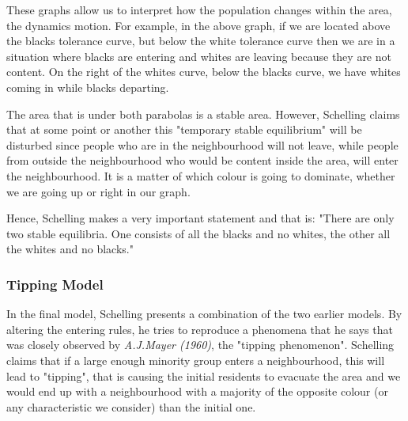 \documentclass[../main.tex]{subfiles}
\begin{document}
These graphs allow us to interpret how the population changes within the area, the dynamics motion. For example, in the above graph, if we are located above the blacks tolerance curve, but below the white tolerance curve then we are in a situation where blacks are entering and whites are leaving because they are not content. On the right of the whites curve, below the blacks curve, we have whites coming in while blacks departing. 

The area that is under both parabolas is a stable area. However, Schelling claims that at some point or another this "temporary stable equilibrium" will be disturbed since people who are in the neighbourhood will not leave, while people from outside the neighbourhood who would be content inside the area, will enter the neighbourhood. It is a matter of which colour is going to dominate, whether we are going up or right in our graph. 

Hence, Schelling makes a very important statement and that is: "There are only two stable equilibria. One consists of all the blacks and no whites, the other all the whites and no blacks."

\subsubsection{Tipping Model}
In the final model, Schelling presents a combination of the two earlier models. By altering the entering rules, he tries to reproduce a phenomena that he says that was closely observed by \textit{A.J.Mayer (1960)}\cite[]{mayer}, the "tipping phenomenon". Schelling claims that if a large enough minority group enters a neighbourhood, this will lead to "tipping", that is causing the initial residents to evacuate the area and we would end up with a neighbourhood with a majority of the opposite colour (or any characteristic we consider) than the initial one.
 
\end{document}
